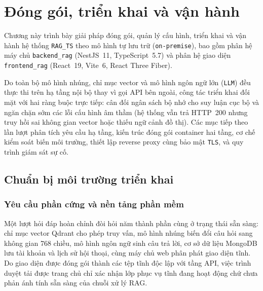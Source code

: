 
\chapter{Đóng gói, triển khai và vận hành}
\label{chap:dong-goi-van-hanh}

Chương này trình bày giải pháp đóng gói, quản lý cấu hình, triển khai và vận hành hệ thống \texttt{RAG\_\allowbreak{}TS} theo mô hình tự lưu trữ (\texttt{on-premise}), bao gồm phân hệ máy chủ \texttt{backend\_\allowbreak{}rag} (NestJS~11, TypeScript~5.7) và phân hệ giao diện \texttt{frontend\_\allowbreak{}rag} (React~19, Vite~6, React Three Fiber).

Do toàn bộ mô hình nhúng, chỉ mục vector và mô hình ngôn ngữ lớn (\texttt{LLM}) đều thực thi trên hạ tầng nội bộ thay vì gọi API bên ngoài, công tác triển khai đối mặt với hai ràng buộc trực tiếp: cân đối ngân sách bộ nhớ cho suy luận cục bộ và ngăn chặn sớm các lỗi cấu hình âm thầm (hệ thống vẫn trả HTTP~200 nhưng truy hồi sai không gian vector hoặc thiếu ngữ cảnh đồ thị). Các mục tiếp theo lần lượt phân tích yêu cầu hạ tầng, kiến trúc đóng gói container hai tầng, cơ chế kiểm soát biến môi trường, thiết lập reverse proxy cùng bảo mật \texttt{TLS}, và quy trình giám sát sự cố.

\section{Chuẩn bị môi trường triển khai}
\label{sec:chuan-bi-moi-truong}

\subsection{Yêu cầu phần cứng và nền tảng phần mềm}
\label{subsec:yeu-cau-ha-tang}

Một lượt hỏi đáp hoàn chỉnh đòi hỏi năm thành phần cùng ở trạng thái sẵn sàng: chỉ mục vector Qdrant cho phép truy vấn, mô hình nhúng biến đổi câu hỏi sang không gian 768 chiều, mô hình ngôn ngữ sinh câu trả lời, cơ sở dữ liệu MongoDB lưu tài khoản và lịch sử hội thoại, cùng máy chủ web phân phát giao diện tĩnh. Do giao diện được đóng gói thành các tệp tĩnh độc lập với tầng API, việc trình duyệt tải được trang chủ chỉ xác nhận lớp phục vụ tĩnh đang hoạt động chứ chưa phản ánh tính sẵn sàng của chuỗi xử lý RAG.


